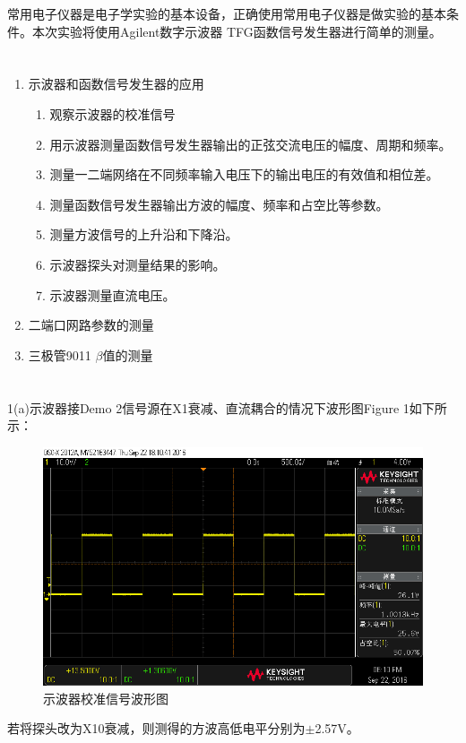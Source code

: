 ﻿\documentclass[10.5pt]{ctexart}
\begin{document}
\title{\textbf{}} %
\author{}
\date{}
\maketitle
\section{\textbf{}}
常用电子仪器是电子学实验的基本设备，正确使用常用电子仪器是做实验的基本条件。本次实验将使用Agilent数字示波器
TFG函数信号发生器进行简单的测量。
\section{\textbf{}}
\begin{enumerate}
\item 示波器和函数信号发生器的应用
\begin{enumerate}
\item 观察示波器的校准信号
\item 用示波器测量函数信号发生器输出的正弦交流电压的幅度、周期和频率。
\item 测量一二端网络在不同频率输入电压下的输出电压的有效值和相位差。
\item 测量函数信号发生器输出方波的幅度、频率和占空比等参数。
\item 测量方波信号的上升沿和下降沿。
\item 示波器探头对测量结果的影响。
\item 示波器测量直流电压。
\end{enumerate}
\item 二端口网路参数的测量
\item 三极管9011 $\beta$值的测量
\end{enumerate}
\section{\textbf{}}
1(a)\quad 示波器接Demo 2信号源在X1衰减、直流耦合的情况下波形图Figure 1如下所示：
\newpage
\begin{figure}[!ht]
\centering
\caption{示波器校准信号波形图}
\includegraphics[width=350pt]{image/CalibratingSignal.png}
\end{figure}
若将探头改为X10衰减，则测得的方波高低电平分别为$\pm$2.57V。
\end{document}
